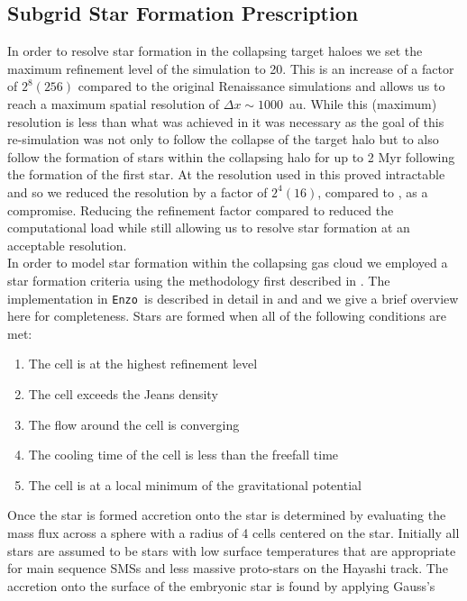 \documentclass[twocolumn,iop,revtex4]{openjournal}
\newcommand{\enzo}{\texttt{Enzo~}}
\begin{document}
 \subsection{Subgrid Star Formation Prescription} \label{Sec:StarFormation}
 \indent In order to resolve star formation in the collapsing target haloes we set the maximum refinement
 level of the simulation to 20. This is an increase of a factor of $2^8 (256)$ compared to the
 original Renaissance simulations and allows us to reach a maximum spatial resolution of $\Delta x \sim 1000$~au.
 While this (maximum) resolution is less than what was achieved
 in \cite{Wise_2019} it was necessary as the goal of this re-simulation was not only to follow the
 collapse of the target halo but to also follow the formation of stars within the collapsing
 halo for up to 2 Myr following the formation of the first star. At the resolution used in
 \cite{Wise_2019} this proved intractable and so we reduced the
 resolution by a factor of $2^4 (16)$, compared to \cite{Wise_2019}, as a compromise. Reducing the
 refinement factor compared to \cite{Wise_2019} reduced the computational load while still allowing us to
 resolve star formation at an acceptable resolution. \\
 \indent In order to model star formation within the collapsing gas cloud we employed a star
 formation criteria using the methodology first described in \cite{Krumholz_2004}. The implementation
 in \enzo is described in detail in \cite{Regan_2018a} and \cite{Regan_2018b} and we give a
 brief overview here for completeness. Stars are formed when all of the following conditions are met:
\begin{enumerate}
\item The cell is at the highest refinement level
\item The cell exceeds the Jeans density 
\item The flow around the cell is converging 
\item The cooling time of the cell is less than the freefall time
\item The cell is at a local minimum of the gravitational potential
\end{enumerate}
Once the star is formed accretion onto the star is determined by evaluating the mass flux across a
sphere with a radius of 4 cells centered on the star. Initially all stars are assumed to be stars with low surface
temperatures that are appropriate for main sequence SMSs and less massive proto-stars on the
Hayashi track. The accretion onto the surface of the embryonic star is found by applying Gauss's
\end{document}
